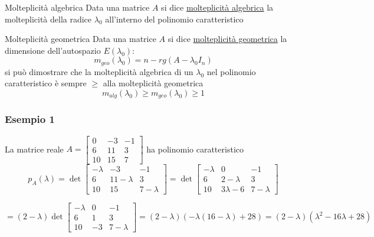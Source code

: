 \begin{definizione}{Molteplicità algebrica}
	Data una matrice $ A $ si dice \underline{molteplicità algebrica} la molteplicità della radice $ \lambda_0 $ all'interno del polinomio caratteristico
\end{definizione}
\begin{definizione}{Molteplicità geometrica}
	Data una matrice $ A $ si dice \underline{molteplicità geometrica} la dimensione dell'autospazio $ E\left( \lambda_0 \right)  $:
	\[
		m_{geo}\left( \lambda_0 \right) = n - rg \left( A- \lambda_0 I_n \right)
	\]
	si può dimostrare che la molteplicità algebrica di un $ \lambda_0 $ nel polinomio caratteristico è sempre $ \ge $ alla molteplicità geometrica
	\[
		m_{alg}\left( \lambda_0 \right) \ge m_{geo}\left( \lambda_0 \right) \ge 1
	\]
\end{definizione}
\subsubsection*{Esempio 1}
La matrice reale $ A= \begin{bmatrix}
		0  & -3 & -1 \\
		6  & 11 & 3  \\
		10 & 15 & 7
	\end{bmatrix} $ ha polinomio caratteristico
\[
	p_A(\lambda)= \det
	\begin{bmatrix}
		-\lambda & -3         & -1        \\
		6        & 11-\lambda & 3         \\
		10       & 15         & 7-\lambda
	\end{bmatrix}
	= \det
	\begin{bmatrix}
		-\lambda & 0           & -1        \\
		6        & 2-\lambda   & 3         \\
		10       & 3 \lambda-6 & 7-\lambda
	\end{bmatrix}
\]

\[
	=(2-\lambda) \det
	\begin{bmatrix}
		-\lambda & 0  & -1        \\
		6        & 1  & 3         \\
		10       & -3 & 7-\lambda
	\end{bmatrix}
	=(2-\lambda)(-\lambda(16-\lambda)+28)=(2-\lambda)\left(\lambda^2-16 \lambda+28\right)
\]

